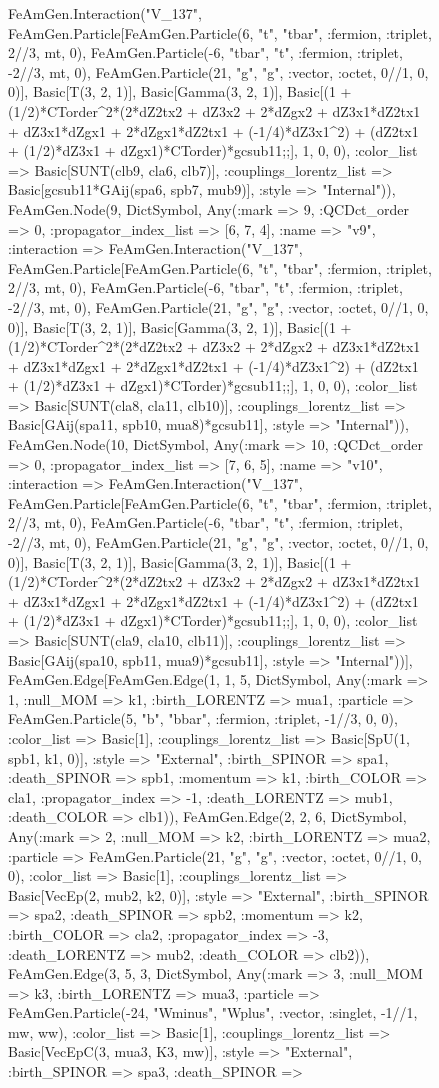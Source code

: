 \documentclass{revtex4}
\begin{document}
\begin{figure}[!htb]
\begin{center}
{FeAmGen.Interaction("V_137", FeAmGen.Particle[FeAmGen.Particle(6, "t", "tbar", :fermion, :triplet, 2//3, mt, 0), FeAmGen.Particle(-6, "tbar", "t", :fermion, :triplet, -2//3, mt, 0), FeAmGen.Particle(21, "g", "g", :vector, :octet, 0//1, 0, 0)], Basic[T(3, 2, 1)], Basic[Gamma(3, 2, 1)], Basic[(1 + (1/2)*CTorder^2*(2*dZ2tx2 + dZ3x2 + 2*dZgx2 + dZ3x1*dZ2tx1 + dZ3x1*dZgx1 + 2*dZgx1*dZ2tx1 + (-1/4)*dZ3x1^2) + (dZ2tx1 + (1/2)*dZ3x1 + dZgx1)*CTorder)*gcsub11;;], 1, 0, 0), :color_list => Basic[SUNT(clb9, cla6, clb7)], :couplings_lorentz_list => Basic[gcsub11*GAij(spa6, spb7, mub9)], :style => "Internal")), FeAmGen.Node(9, Dict{Symbol, Any}(:mark => 9, :QCDct_order => 0, :propagator_index_list => [6, 7, 4], :name => "v9", :interaction => FeAmGen.Interaction("V_137", FeAmGen.Particle[FeAmGen.Particle(6, "t", "tbar", :fermion, :triplet, 2//3, mt, 0), FeAmGen.Particle(-6, "tbar", "t", :fermion, :triplet, -2//3, mt, 0), FeAmGen.Particle(21, "g", "g", :vector, :octet, 0//1, 0, 0)], Basic[T(3, 2, 1)], Basic[Gamma(3, 2, 1)], Basic[(1 + (1/2)*CTorder^2*(2*dZ2tx2 + dZ3x2 + 2*dZgx2 + dZ3x1*dZ2tx1 + dZ3x1*dZgx1 + 2*dZgx1*dZ2tx1 + (-1/4)*dZ3x1^2) + (dZ2tx1 + (1/2)*dZ3x1 + dZgx1)*CTorder)*gcsub11;;], 1, 0, 0), :color_list => Basic[SUNT(cla8, cla11, clb10)], :couplings_lorentz_list => Basic[GAij(spa11, spb10, mua8)*gcsub11], :style => "Internal")), FeAmGen.Node(10, Dict{Symbol, Any}(:mark => 10, :QCDct_order => 0, :propagator_index_list => [7, 6, 5], :name => "v10", :interaction => FeAmGen.Interaction("V_137", FeAmGen.Particle[FeAmGen.Particle(6, "t", "tbar", :fermion, :triplet, 2//3, mt, 0), FeAmGen.Particle(-6, "tbar", "t", :fermion, :triplet, -2//3, mt, 0), FeAmGen.Particle(21, "g", "g", :vector, :octet, 0//1, 0, 0)], Basic[T(3, 2, 1)], Basic[Gamma(3, 2, 1)], Basic[(1 + (1/2)*CTorder^2*(2*dZ2tx2 + dZ3x2 + 2*dZgx2 + dZ3x1*dZ2tx1 + dZ3x1*dZgx1 + 2*dZgx1*dZ2tx1 + (-1/4)*dZ3x1^2) + (dZ2tx1 + (1/2)*dZ3x1 + dZgx1)*CTorder)*gcsub11;;], 1, 0, 0), :color_list => Basic[SUNT(cla9, cla10, clb11)], :couplings_lorentz_list => Basic[GAij(spa10, spb11, mua9)*gcsub11], :style => "Internal"))], FeAmGen.Edge[FeAmGen.Edge(1, 1, 5, Dict{Symbol, Any}(:mark => 1, :null_MOM => k1, :birth_LORENTZ => mua1, :particle => FeAmGen.Particle(5, "b", "bbar", :fermion, :triplet, -1//3, 0, 0), :color_list => Basic[1], :couplings_lorentz_list => Basic[SpU(1, spb1, k1, 0)], :style => "External", :birth_SPINOR => spa1, :death_SPINOR => spb1, :momentum => k1, :birth_COLOR => cla1, :propagator_index => -1, :death_LORENTZ => mub1, :death_COLOR => clb1)), FeAmGen.Edge(2, 2, 6, Dict{Symbol, Any}(:mark => 2, :null_MOM => k2, :birth_LORENTZ => mua2, :particle => FeAmGen.Particle(21, "g", "g", :vector, :octet, 0//1, 0, 0), :color_list => Basic[1], :couplings_lorentz_list => Basic[VecEp(2, mub2, k2, 0)], :style => "External", :birth_SPINOR => spa2, :death_SPINOR => spb2, :momentum => k2, :birth_COLOR => cla2, :propagator_index => -3, :death_LORENTZ => mub2, :death_COLOR => clb2)), FeAmGen.Edge(3, 5, 3, Dict{Symbol, Any}(:mark => 3, :null_MOM => k3, :birth_LORENTZ => mua3, :particle => FeAmGen.Particle(-24, "Wminus", "Wplus", :vector, :singlet, -1//1, mw, ww), :color_list => Basic[1], :couplings_lorentz_list => Basic[VecEpC(3, mua3, K3, mw)], :style => "External", :birth_SPINOR => spa3, :death_SPINOR => }
\end{center}
\end{figure}
\end{document}
